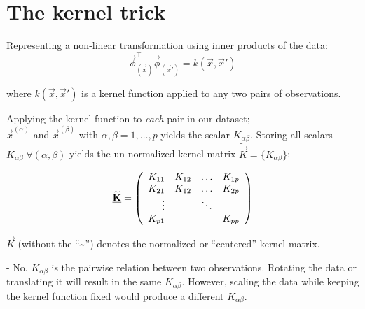 \section{The kernel trick}

Representing a non-linear transformation using inner products of the data:
\begin{equation}
 \label{eq:trick}
      \vec{\phi}_{(\vec{x})}^\top 
		\vec{\phi}_{(\vec{x}')} = 
      k(\vec{x}, \vec{x}')
\end{equation}
    
where $k(\vec{x}, \vec{x}')$ is a kernel function applied 
to any two pairs of observations.

Applying the kernel function to \emph{each} pair in our dataset; \\
$\vec x^{(\alpha)}$ and $\vec{x}^{(\beta)}$ 
with $\alpha, \beta = 1, \ldots, p$ yields the scalar $K_{\alpha \beta}$. 
Storing all scalars $K_{\alpha \beta} \; \forall (\alpha,\beta)$ yields 
the un-normalized kernel matrix $\widetilde {\vec K}=\{K_{\alpha \beta}\}$:

$$
\widetilde {\underline{\mathbf{K}}} = 
\left( \begin{array}{rrrrrrrrrrrrrrrrrrrrrrrrrr} 
K_{11} & K_{12} & \ldots & K_{1p} \\
K_{21} & K_{12} & \ldots & K_{2p} \\
\vdots & & \ddots\\
K_{p1} & & & K_{pp}
\\ \end{array} \right)
$$

$\vec K$ (without the ``\textasciitilde'') denotes the normalized or ``centered'' kernel matrix.



- No. $K_{\alpha \beta}$ is the pairwise relation between two observations. 
Rotating the data or translating it will result in the same $K_{\alpha \beta}$. 
However, scaling the data while keeping the kernel function fixed would produce a different $K_{\alpha \beta}$.
